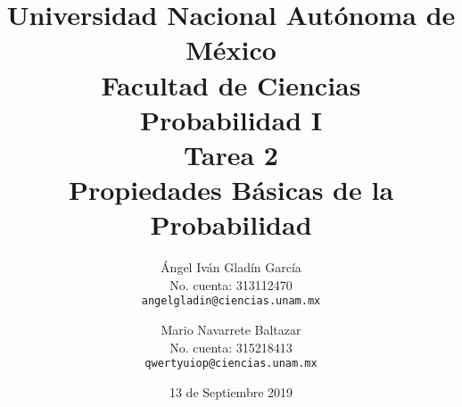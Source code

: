 \documentclass[11pt,letterpaper]{report}
\begin{document}
\title{
        Universidad Nacional Autónoma de México\\
        Facultad de Ciencias\\
        Probabilidad I\\
    \vspace{1cm}
    \large
        \textbf{Tarea 2}\\
        \textbf{Propiedades Básicas de la Probabilidad}
}
\author{
    Ángel Iván Gladín García\\
    No. cuenta: 313112470\\
    \texttt{angelgladin@ciencias.unam.mx}
    \and
    Mario Navarrete Baltazar\\
    No. cuenta: 315218413\\
    \texttt{qwertyuiop@ciencias.unam.mx}
}
\date{13 de Septiembre 2019}
\maketitle

\newtheorem{theorem}{Teorema}
\newtheorem{example}{Ejemplo}
\newtheorem{corollary}{Corolario}
\newtheorem{lemma}{Lemma}
\newtheorem{definition}{Definicion}
\newtheorem{prop}{Proposicion}
\end{document}
